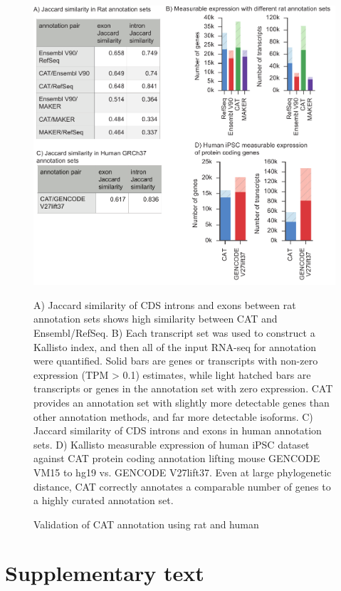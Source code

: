 \documentclass[fleqn,10pt]{wlscirep}
\newcommand{\beginsupplement}{%
        \setcounter{table}{0}
        \renewcommand{\thetable}{S\arabic{table}}%
        \setcounter{figure}{0}
        \renewcommand{\thefigure}{S\arabic{figure}}%
     }
\begin{document}
\begin{figure}
\centering
\includegraphics[width=\textwidth,height=\textheight,keepaspectratio]{figure5-rat_v15.pdf}
\caption{Validation of CAT annotation using rat and human}
A) Jaccard similarity of CDS introns and exons between rat annotation sets shows high similarity between CAT and Ensembl/RefSeq. B) Each transcript set was used to construct a Kallisto \cite{bray2015near} index, and then all of the input RNA-seq for annotation were quantified. Solid bars are genes or transcripts with non-zero expression (TPM > 0.1) estimates, while light hatched bars are transcripts or genes in the annotation set with zero expression. CAT provides an annotation set with slightly more detectable genes than other annotation methods, and far more detectable isoforms. C) Jaccard similarity of CDS introns and exons in human annotation sets. D) Kallisto measurable expression of human iPSC dataset against CAT protein coding annotation lifting mouse GENCODE VM15 to hg19 vs. GENCODE V27lift37. Even at large phylogenetic distance, CAT correctly annotates a comparable number of genes to a highly curated annotation set.
\label{fig:fig5}
\end{figure}

\clearpage
\beginsupplement

\section{Supplementary text}
\end{document}
